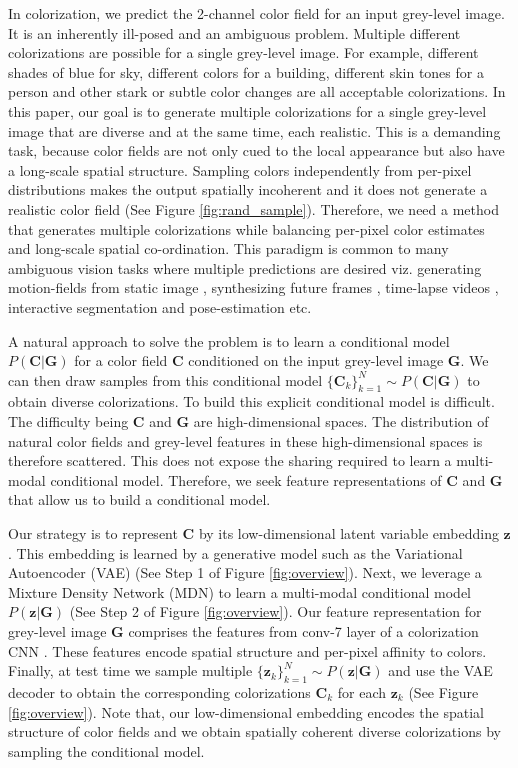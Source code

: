 \documentclass[10pt,twocolumn,letterpaper]{article}
\begin{document}
In colorization, we predict the 2-channel color field for an input
grey-level image. It is an inherently ill-posed and an ambiguous 
problem. Multiple different colorizations are possible for a 
single grey-level image. For example, different shades of blue 
for sky, different colors for a building, different skin tones for a person 
and other stark or subtle color changes  are all acceptable colorizations. 
In this paper, our goal is to generate multiple colorizations for a single grey-level image that are 
diverse and at the same time, each realistic. This is a 
demanding task, because color fields are not only cued to the
local appearance but also have a long-scale spatial structure.
Sampling colors independently from per-pixel distributions 
makes the output spatially incoherent and it does not generate a 
realistic color field (See Figure \ref{fig:rand_sample}). Therefore, we need a method that generates
multiple colorizations while balancing per-pixel color 
estimates and long-scale spatial co-ordination. This paradigm
is common to many ambiguous vision tasks where multiple 
predictions are desired viz. generating motion-fields from
static image \cite{Walker}, synthesizing future frames \cite{CrossConv}, 
time-lapse videos \cite{TLBerg}, interactive segmentation and
pose-estimation \cite{Batra} etc.

A natural approach to solve the problem is to learn a conditional 
model $P(\mathbf{C}|\mathbf{G})$ for a color field $\mathbf{C}$ conditioned 
on the input grey-level image $\mathbf{G}$. We can then draw samples from 
this conditional model $\{\mathbf{C}_k\}_{k=1}^{N} \sim P(\mathbf{C}|\mathbf{G})$ 
to obtain diverse colorizations. To build this explicit conditional model 
is difficult. The difficulty being $\mathbf{C}$ and $\mathbf{G}$ are 
high-dimensional spaces. The distribution of natural color fields and 
grey-level features  in these high-dimensional spaces is therefore scattered. This does not
expose the sharing required to learn a multi-modal conditional model. Therefore, 
we seek feature representations of $\mathbf{C}$ and $\mathbf{G}$ that allow us to 
build a conditional model.

Our strategy is to represent $\mathbf{C}$ by its low-dimensional
latent variable embedding $\mathbf{z}$. This embedding is learned 
by a generative model such as the Variational Autoencoder (VAE) 
\cite{AEB} (See Step 1 of Figure \ref{fig:overview}). Next, we leverage 
a Mixture Density Network (MDN) to learn a multi-modal conditional 
model $P(\mathbf{z}|\mathbf{G})$ (See Step 2 of Figure \ref{fig:overview}). 
Our feature representation for grey-level image $\mathbf{G}$ comprises 
the features from conv-7 layer of a colorization CNN \cite{ZhangColorful}. 
These features encode spatial structure and per-pixel affinity to colors. Finally, 
at test time we sample multiple $\{ \mathbf{z}_{k} \}_{k=1}^{N} \sim P(\mathbf{z}|\mathbf{G})$ 
and use the VAE decoder to obtain the corresponding colorizations $\mathbf{C}_k$
for each $\mathbf{z}_k$ (See Figure \ref{fig:overview}). Note that, 
our low-dimensional embedding encodes the spatial structure of color fields 
and we obtain spatially coherent diverse colorizations by sampling the 
conditional model.
\end{document}
